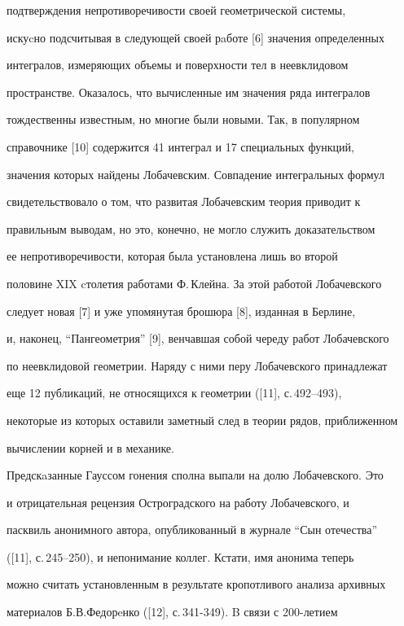подтверждения непротиворечивости своей геометрической системы, 


искуcно подсчитывая в следующей своей рaботе [6] значения определенных 


интегралов, измеряющих объемы и поверхности тел в неевклидовом


пространстве. Оказалось, что вычисленные им значения ряда интегралов 


тождественны известным, но многие были новыми. Так, в популярном 


справочнике [10] содержится 41 интеграл и 17 специальных функций, 


значения которых найдены Лобачевским. Совпадение интегральных формул 


свидетельствовало о том, что развитая Лобачевским теория приводит к 


правильным выводам, но это, конечно, не могло служить доказательством 


ее непротиворечивости, которая была установлена лишь во второй 


половине XIX cтолетия работами Ф.\,Клейна. За этой работой Лобачевского 


следует новая [7] и уже упомянутая брошюра [8], изданная в Берлине, 


и, наконец, ``Пангеометрия'' [9], венчавшая собой череду работ Лобачевского 


по неевклидовой геометрии. Наряду с ними перу Лобачевского принадлежат 


еще 12 публикаций, не относящихся к геометрии ([11], с.\,492--493), 


некоторые из которых оставили заметный след в теории рядов, приближенном 


вычислении корней и в механике.





Предскaзанные Гауссом гонения сполна выпали на долю Лобачевского. Это 


и отрицательная рецензия Остроградского на работу Лобачевского, и 


пасквиль анонимного автора, опубликованный в журнале ``Сын отечества''


([11], с.\,245--250), и непонимание коллег. Кстати, имя анонима теперь 


можно считать установленным в результате кропотливого анализа архивных 


материалов Б.В.Федорeнко ([12], с.\,341-349). B связи с 200-летием 


